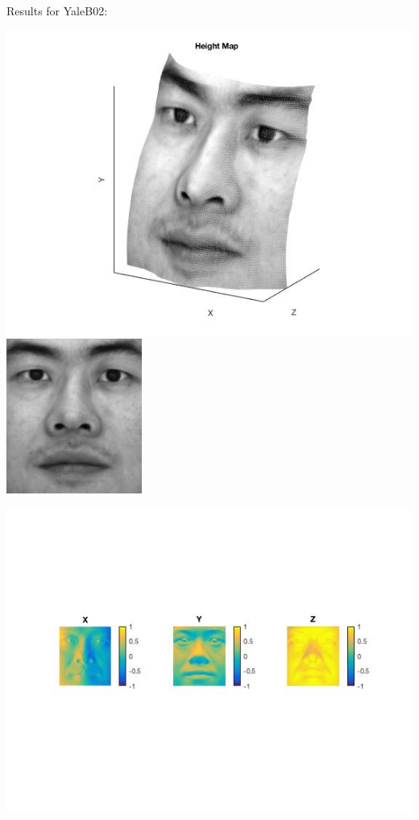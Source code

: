 \documentclass[fleqn]{article}
\begin{document}
\newpage

Results for YaleB02:
 
\vspace{10 mm}
\includegraphics{yaleB02.jpg}
\newpage
\includegraphics{yaleB02_albedo.jpg}

\includegraphics{a2.jpg}
\end{document}

